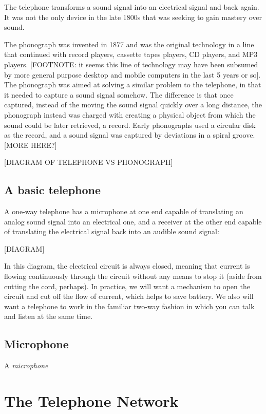 \documentclass[UTF8]{book}
\begin{document}
\begin{CJK}{UTF8}{gbsn}
The telephone transforms a sound signal into an electrical signal and back again. It was not the only device in the late 1800s that was seeking to gain mastery over sound.

The phonograph was invented in 1877 and was the original technology in a line that continued with record players, cassette tapes players, CD players, and MP3 players. [FOOTNOTE: it seems this line of technology may have been subsumed by more general purpose desktop and mobile computers in the last 5 years or so]. The phonograph was aimed at solving a similar problem to the telephone, in that it needed to capture a sound signal somehow. The difference is that once captured, instead of the moving the sound signal quickly over a long distance, the phonograph instead was charged with creating a physical object from which the sound could be later retrieved, a record. Early phonographs used a circular disk as the record, and a sound signal was captured by deviations in a spiral groove. [MORE HERE?]

[DIAGRAM OF TELEPHONE VS PHONOGRAPH]

\section{A basic telephone}

A one-way telephone has a microphone at one end capable of translating an analog sound signal into an electrical one, and a receiver at the other end capable of translating the electrical signal back into an audible sound signal:

[DIAGRAM]

In this diagram, the electrical circuit is always closed, meaning that current is flowing continuously through the circuit without any means to stop it (aside from cutting the cord, perhaps). In practice, we will want a mechanism to open the circuit and cut off the flow of current, which helps to save battery. We also will want a telephone to work in the familiar two-way fashion in which you can talk and listen at the same time.

\section{Microphone}

A \emph{microphone}




\chapter{The Telephone Network}



\end{CJK}
\end{document}
